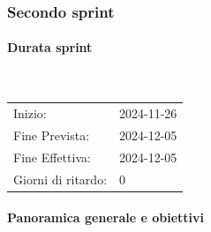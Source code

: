 \documentclass[10pt]{article}
\begin{document}
{{%

\newpage
\subsubsection{Secondo sprint}
\label{secondo-sprint$_G$}
    
    \paragraph{Durata sprint}\mbox{}\\
    \vspace{-1.5em}
    \begin{table}[h] 
    \renewcommand{\arraystretch}{1.2}  
    \begin{tabular}{ l l }
        Inizio: & 2024-11-26 \\
        Fine Prevista: & 2024-12-05 \\
        Fine Effettiva: & 2024-12-05 \\
        Giorni di ritardo: & 0 \\
    \end{tabular}
    \end{table}
    \vspace{-2em}
    {\renewcommand{\arraystretch}{1.5}%
    
    \paragraph{Panoramica generale e obiettivi}\mbox{}\vspace{0.4em}
    
}}}
\end{document}

